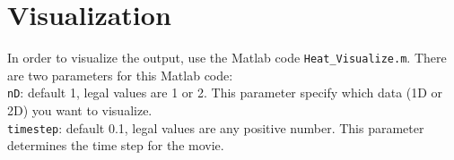 \documentclass[letterpaper,12pt,fleqn]{article}
\newcommand{\code}[1]{\colorbox{shadecolor}{\tt #1}}
\begin{document}
\section*{Visualization}
In order to visualize the output, use the Matlab code \verb|Heat_Visualize.m|.
There are two parameters for this Matlab code:\\
\indent\code{nD}: default 1, legal values are 1 or 2.
This parameter specify which data (1D or 2D) you want to visualize.\\
\indent\code{timestep}: default 0.1, legal values are any positive number.
This parameter determines the time step for the movie.
\end{document}
